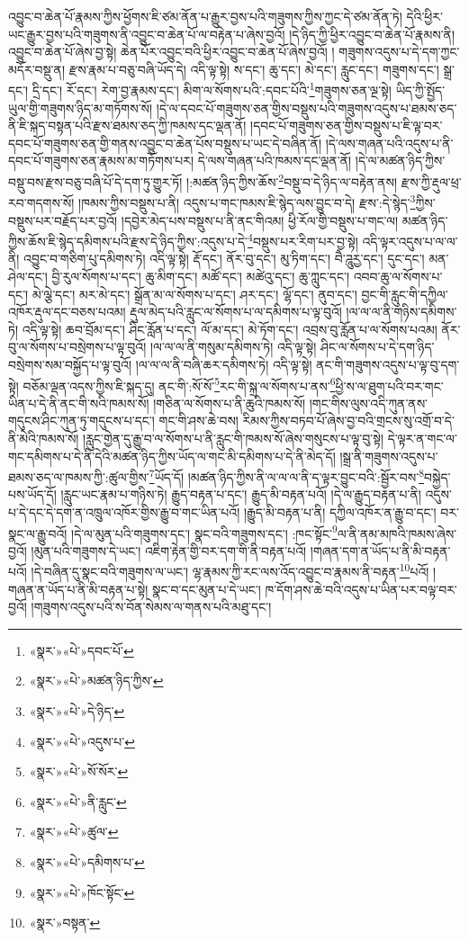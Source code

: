 འབྱུང་བ་ཆེན་པོ་རྣམས་ཀྱིས་ཕྱོགས་ཇི་ཙམ་ནོན་པ་རྒྱུར་བྱས་པའི་གཟུགས་ཀྱིས་ཀྱང་དེ་ཙམ་ནོན་ཏེ། དེའི་ཕྱིར་ཡང་རྒྱུར་བྱས་པའི་གཟུགས་ནི་འབྱུང་བ་ཆེན་པོ་ལ་བརྟེན་པ་ཞེས་བྱའོ། །དེ་ཉིད་ཀྱི་ཕྱིར་འབྱུང་བ་ཆེན་པོ་རྣམས་ནི། འབྱུང་བ་ཆེན་པོ་ཞེས་བྱ་སྟེ། ཆེན་པོར་འབྱུང་བའི་ཕྱིར་འབྱུང་བ་ཆེན་པོ་ཞེས་བྱའོ། །
གཟུགས་འདུས་པ་དེ་དག་ཀྱང་མདོར་བསྡུ་ན། རྫས་རྣམ་པ་བཅུ་བཞི་ཡོད་དེ། འདི་ལྟ་སྟེ། ས་དང་། ཆུ་དང་། མེ་དང་། རླུང་དང་། གཟུགས་དང་། སྒྲ་དང་། དྲི་དང་། རོ་དང་། རེག་བྱ་རྣམས་དང་། མིག་ལ་སོགས་པའི་:དབང་པོའི་\footnote{«སྣར་»«པེ་»དབང་པོ་}གཟུགས་ཅན་ལྔ་སྟེ། ཡིད་ཀྱི་སྤྱོད་ཡུལ་གྱི་གཟུགས་ཉིད་མ་གཏོགས་སོ། །དེ་ལ་དབང་པོ་གཟུགས་ཅན་གྱིས་བསྡུས་པའི་གཟུགས་འདུས་པ་ཐམས་ཅད་ནི་ཇི་སྐད་བསྟན་པའི་རྫས་ཐམས་ཅད་ཀྱི་ཁམས་དང་ལྡན་ནོ། །དབང་པོ་གཟུགས་ཅན་གྱིས་བསྡུས་པ་ཇི་ལྟ་བར་དབང་པོ་གཟུགས་ཅན་གྱི་གནས་འབྱུང་བ་ཆེན་པོས་བསྡུས་པ་ཡང་དེ་བཞིན་ནོ། །དེ་ལས་གཞན་པའི་འདུས་པ་ནི་དབང་པོ་གཟུགས་ཅན་རྣམས་མ་གཏོགས་པར། དེ་ལས་གཞན་པའི་ཁམས་དང་ལྡན་ནོ། །དེ་ལ་མཚན་ཉིད་ཀྱིས་བསྡུ་བས་རྫས་བཅུ་བཞི་པོ་དེ་དག་ཏུ་གྱུར་ཏོ། །:མཚན་ཉིད་ཀྱིས་ཆོས་\footnote{«སྣར་»«པེ་»མཚན་ཉིད་ཀྱིས་}བསྡུ་བ་དེ་ཉིད་ལ་བརྟེན་ནས། རྫས་ཀྱི་རྡུལ་ཕྲ་རབ་གདགས་སོ། །ཁམས་ཀྱིས་བསྡུས་པ་ནི། འདུས་པ་གང་ཁམས་ཇི་སྙེད་ལས་བྱུང་བ་དེ། རྫས་:དེ་སྙེད་\footnote{«སྣར་»«པེ་»དེ་ཉིད་}ཀྱིས་བསྡུས་པར་བརྗོད་པར་བྱའོ། །དབྱེར་མེད་པས་བསྡུས་པ་ནི་ནང་གིའམ། ཕྱི་རོལ་གྱི་བསྡུས་པ་གང་ལ། མཚན་ཉིད་ཀྱིས་ཆོས་ཇི་སྙེད་དམིགས་པའི་རྫས་དེ་ཉིད་ཀྱིས་:འདུས་པ་དེ་\footnote{«སྣར་»«པེ་»འདུས་པ་}བསྡུས་པར་རིག་པར་བྱ་སྟེ། འདི་ལྟར་འདུས་པ་ལ་ལ་ནི། འབྱུང་བ་གཅིག་པུ་དམིགས་ཏེ། འདི་ལྟ་སྟེ། རྡོ་དང་། ནོར་བུ་དང་། མུ་ཏིག་དང་། བཻ་ཌཱུརྱ་དང་། དུང་དང་། མན་ཤེལ་དང་། བྱི་རུལ་སོགས་པ་དང་། ཆུ་མིག་དང་། མཚོ་དང་། མཚེའུ་དང་། ཆུ་ཀླུང་དང་། འབབ་ཆུ་ལ་སོགས་པ་དང་། མེ་ལྕེ་དང་། མར་མེ་དང་། སྒྲོན་མ་ལ་སོགས་པ་དང་། ཤར་དང་། ལྷོ་དང་། ནུབ་དང་། བྱང་གི་རླུང་གི་དཀྱིལ་འཁོར་རྡུལ་དང་བཅས་པའམ། རྡུལ་མེད་པའི་རླུང་ལ་སོགས་པ་ལ་དམིགས་པ་ལྟ་བུའོ། །ལ་ལ་ལ་ནི་གཉིས་དམིགས་ཏེ། འདི་ལྟ་སྟེ། ཆབ་བྲོམ་དང་། ཤིང་རློན་པ་དང་། ལོ་མ་དང་། མེ་ཏོག་དང་། འབྲས་བུ་རློན་པ་ལ་སོགས་པའམ། ནོར་བུ་ལ་སོགས་པ་བསྲེགས་པ་ལྟ་བུའོ། །ལ་ལ་ལ་ནི་གསུམ་དམིགས་ཏེ། འདི་ལྟ་སྟེ། ཤིང་ལ་སོགས་པ་དེ་དག་ཉིད་བསྲེགས་སམ་བསྐྱོད་པ་ལྟ་བུའོ། །ལ་ལ་ལ་ནི་བཞི་ཆར་དམིགས་ཏེ། འདི་ལྟ་སྟེ། ནང་གི་གཟུགས་འདུས་པ་ལྟ་བུ་དག་སྟེ། བཅོམ་ལྡན་འདས་ཀྱིས་ཇི་སྐད་དུ། ནང་གི་:སོ་སོ་\footnote{«སྣར་»«པེ་»སོ་སོར་}རང་གི་སྐྲ་ལ་སོགས་པ་ནས་\footnote{«སྣར་»«པེ་»ནི་རླུང་}ཕྱི་ས་ལ་ཐུག་པའི་བར་གང་ཡིན་པ་དེ་ནི་ནང་གི་སའི་ཁམས་སོ། །གཅིན་ལ་སོགས་པ་ནི་ཆུའི་ཁམས་སོ། །གང་གིས་ལུས་འདི་ཀུན་ནས་གདུངས་ཤིང་ཀུན་ཏུ་གདུངས་པ་དང་། གང་གི་ཤས་ཆེ་བས། རིམས་ཀྱིས་བཏབ་པོ་ཞེས་བྱ་བའི་གྲངས་སུ་འགྲོ་བ་དེ་ནི་མེའི་ཁམས་སོ། །རླུང་གྱེན་དུ་རྒྱུ་བ་ལ་སོགས་པ་ནི་རླུང་གི་ཁམས་སོ་ཞེས་གསུངས་པ་ལྟ་བུ་སྟེ། དེ་ལྟར་ན་གང་ལ་གང་དམིགས་པ་དེ་ནི་དེའི་མཚན་ཉིད་ཀྱིས་ཡོད་ལ་གང་མི་དམིགས་པ་དེ་ནི་མེད་དོ། །སྒྲ་ནི་གཟུགས་འདུས་པ་ཐམས་ཅད་ལ་ཁམས་ཀྱི་:ཚུལ་གྱིས་\footnote{«སྣར་»«པེ་»ཚུལ་}ཡོད་དོ། །མཚན་ཉིད་ཀྱིས་ནི་ལ་ལ་ལ་ནི་ད་ལྟར་བྱུང་བའི་:སྦྱོར་བས་\footnote{«སྣར་»«པེ་»དམིགས་པ་}བསྐྱེད་པས་ཡོད་དོ། །རླུང་ཡང་རྣམ་པ་གཉིས་ཏེ། རྒྱུད་བརྟན་པ་དང་། རྒྱུད་མི་བརྟན་པའོ། །དེ་ལ་རྒྱུད་བརྟན་པ་ནི། འདུས་པ་དེ་དང་དེ་དག་ན་འཁྲུལ་འཁོར་གྱིས་རྒྱུ་བ་གང་ཡིན་པའོ། །རྒྱུད་མི་བརྟན་པ་ནི། དཀྱིལ་འཁོར་ན་རྒྱུ་བ་དང་། བར་སྣང་ལ་རྒྱུ་བའོ། །དེ་ལ་མུན་པའི་གཟུགས་དང་། སྣང་བའི་གཟུགས་དང་། :ཁང་སྟོང་\footnote{«སྣར་»«པེ་»ཁོང་སྟོང་}ལ་ནི་ནམ་མཁའི་ཁམས་ཞེས་བྱའོ། །མུན་པའི་གཟུགས་དེ་ཡང་། འཇིག་རྟེན་གྱི་བར་དག་གི་ནི་བརྟན་པའོ། །གཞན་དག་ན་ཡོད་པ་ནི་མི་བརྟན་པའོ། །དེ་བཞིན་དུ་སྣང་བའི་གཟུགས་ལ་ཡང་། ལྷ་རྣམས་ཀྱི་རང་ལས་འོད་འབྱུང་བ་རྣམས་ནི་བརྟན་\footnote{«སྣར་»བསྟན་}པའོ། །གཞན་ན་ཡོད་པ་ནི་མི་བརྟན་པ་སྟེ། སྣང་བ་དང་མུན་པ་དེ་ཡང་། ཁ་དོག་ཤས་ཆེ་བའི་འདུས་པ་ཡིན་པར་བལྟ་བར་བྱའོ། །གཟུགས་འདུས་པའི་ས་བོན་སེམས་ལ་གནས་པའི་མཐུ་དང་། 
